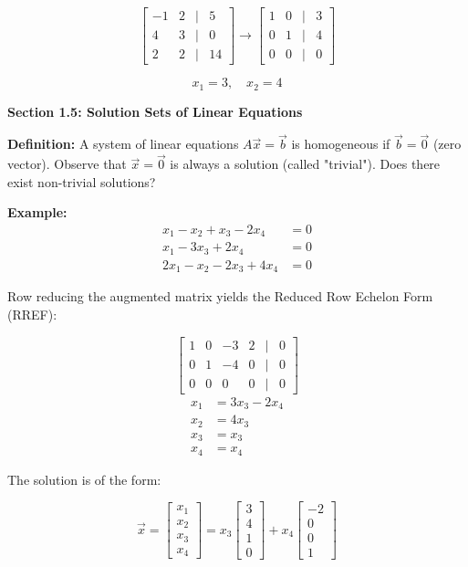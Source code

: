 \documentclass{article}
\begin{document}
\[
\begin{bmatrix}
    -1 & 2 & \vert & 5 \\
    4 & 3 & \vert & 0 \\
    2 & 2 & \vert & 14
\end{bmatrix}
\rightarrow
\begin{bmatrix}
    1 & 0 & \vert & 3 \\
    0 & 1 & \vert & 4 \\
    0 & 0 & \vert & 0
\end{bmatrix}
\]

\[x_1 = 3, \quad x_2 = 4\]

\textbf{Section 1.5: Solution Sets of Linear Equations}

\textbf{Definition:} A system of linear equations \(A\vec{x} = \vec{b}\) is homogeneous if \(\vec{b} = \vec{0}\) (zero vector). Observe that \(\vec{x} = \vec{0}\) is always a solution (called "trivial"). Does there exist non-trivial solutions?

\textbf{Example:}
\[
\begin{aligned}
    x_1 - x_2 + x_3 - 2x_4 &= 0 \\
    x_1 - 3x_3 + 2x_4 &= 0 \\
    2x_1 - x_2 - 2x_3 + 4x_4 &= 0
\end{aligned}
\]

Row reducing the augmented matrix yields the Reduced Row Echelon Form (RREF):

\[
\begin{bmatrix}
    1 & 0 & -3 & 2 & \vert & 0 \\
    0 & 1 & -4 & 0 & \vert & 0 \\
    0 & 0 & 0 & 0 & \vert & 0
\end{bmatrix}
\]
\medskip
\[
\begin{aligned}
    x_1 &= 3x_3 - 2x_4 \\
    x_2 &= 4x_3 \\
    x_3 &= x_3 \\
    x_4 &= x_4
\end{aligned}
\]

The solution is of the form:

\[
\vec{x} = 
\begin{bmatrix}
    x_1 \\
    x_2 \\
    x_3 \\
    x_4
\end{bmatrix}
= x_3
\begin{bmatrix}
    3 \\
    4 \\
    1 \\
    0
\end{bmatrix}
+ x_4
\begin{bmatrix}
    -2 \\
    0 \\
    0 \\
    1
\end{bmatrix}
\]
\end{document}

